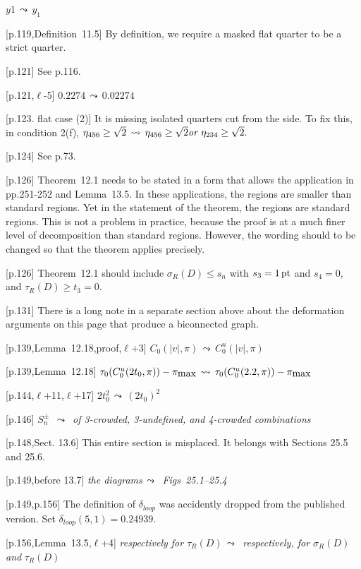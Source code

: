 \documentclass[11pt]{amsart}
\def\op#1{{\text{#1}}}
\def\lto{\ensuremath{\,\leadsto\,}}
\def\line{$\ell$}
\def\text{\hbox}
\def\sz{small} %
\def\rmx{\rm}
\begin{document}
\begin{\sz}
[p.117,Def~11.8]
    $
    y1 \lto y_1
    $
    
 
[p.119,Definition~11.5]  {\rmx By definition, we require a masked flat quarter to
be a strict quarter.}
	
[p.121] {\rmx See p.116.}

[p.121,\line-5]
	$
	0.2274 \lto 0.02274
	$


	
[p.123. flat case (2)]  {\rmx It is missing
isolated quarters cut from the side.
To fix this, in condition 2(f), }
	$
	\eta_{456}\ge\sqrt2 \lto
	\eta_{456}\ge\sqrt2 \text{\it or } \eta_{234}\ge\sqrt2.
	$
	
[p.124] {\rmx See p.73. }
	
[p.126]  {\rmx Theorem~12.1 needs to be stated in
a form that allows the application in pp.251-252
and Lemma~13.5.  In these applications, the
regions are smaller than standard regions.
Yet in the statement of the theorem, the regions
are standard regions.  This is not a problem
in practice, because the proof is at a much
finer level of decomposition than standard regions.
However, the wording should to be changed so
that the theorem applies precisely.}


[p.126] 
{\rmx Theorem~12.1 should include $\sigma_R(D)\le s_n$
with $s_3 = 1\,\op{pt}$ and $s_4=0$, and
$\tau_R(D) \ge t_3 = 0$.}

[p.131] {\rmx There is a long note in a separate section above about
the deformation arguments on this page that produce a biconnected graph.}


[p.139,Lemma~12.18,proof,\line+3] 
	$C_0(|v|,\pi) \lto
	C_0^u(|v|,\pi)
	$
	
[p.139,Lemma~12.18] 
	$
	\tau_0(C_0^u(2t_0,\pi))-\pi_{\text{max}}\lto
	\tau_0(C_0^u(2.2,\pi))-\pi_{\text{max}}
	$

[p.144,\line+11,\line+17]
	$2t_0^2 \lto (2t_0)^2
	$

[p.146]
		$S_n^\pm$ \lto
	{\it of 3-crowded, 3-undefined, and
	4-crowded combinations}

[p.148,Sect. 13.6]  {\rmx This entire
section is misplaced.  It belongs with
Sections 25.5 and 25.6.}

[p.149,before 13.7]
{\it the diagrams\lto
	Figs~25.1--25.4}

[p.149,p.156] {\rmx The definition of $\delta_{loop}$ was accidently
dropped from the published version.  Set $\delta_{loop}(5,1)=0.24939$.
}

[p.156,Lemma~13.5,\line+4]
	{\it respectively for $\tau_R(D)$\lto
	respectively, for $\sigma_R(D)$ and }
	$\tau_R(D)$ 


\end{\sz}
\end{document}
